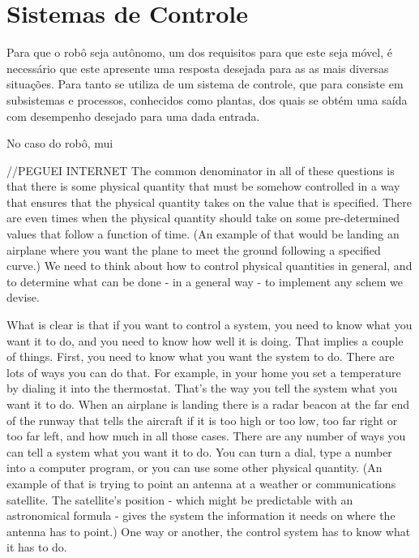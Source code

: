 \section{Sistemas de Controle} \label{cap:controle}

Para que o robô seja autônomo, um dos requisitos para que este seja móvel, é necessário que este apresente uma resposta desejada para as 
as mais diversas situações. Para tanto se utiliza de um sistema de controle, que para  consiste em subsistemas e 
processos, conhecidos como plantas, dos quais se obtém uma saída com desempenho desejado para uma dada entrada.

No caso do robô, mui

//PEGUEI INTERNET
The common denominator in all of these questions is that there is some physical quantity that must be somehow controlled in a way 
that ensures that the physical quantity takes on the value that is specified.  There are even times when the physical quantity should 
take on some pre-determined values that follow a function of time.  (An example of that would be landing an airplane where you want the 
plane to meet the ground following a specified curve.)  We need to think about how to control physical quantities in general, and to 
determine what can be done - in a general way - to implement any schem we devise.

What is clear is that if you want to control a system, you need to know what you want it to do, and you need to know how well it
is doing.  That implies a couple of things.  First, you need to know what you want the system to do.  There are lots of ways you can 
do that.  For example, in your home you set a temperature by dialing it into the thermostat.  That's the way you tell the system 
what you want it to do.  When an airplane is landing there is a radar beacon at the far end of the runway that tells the aircraft 
if it is too high or too low, too far right or too far left, and how much in all those cases.  There are any number of ways you can 
tell a system what you want it to do.  You can turn a dial, type a number into a computer program, or you can use some other physical 
quantity.  (An example of that is trying to point an antenna at a weather or communications satellite.  The satellite's position - 
which might be predictable with an astronomical formula - gives the system the information it needs on where the antenna has to point.) 
One way or another, the control system has to know what it has to do. 






